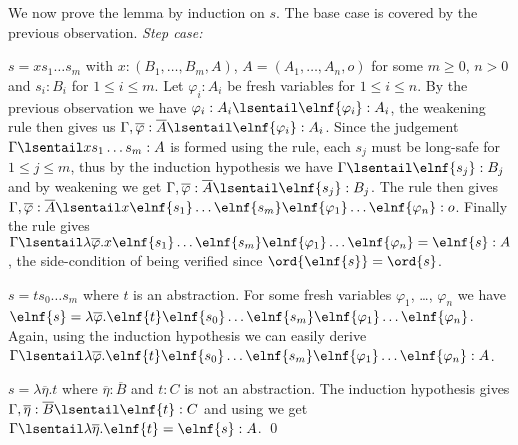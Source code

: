 We now prove the lemma by induction on $s$.
The base case is covered by the previous observation.
\emph{Step case:}
\begin{compactitem}
\item $s = x s_1 \ldots s_m$ with $x: (B_1, \ldots, B_m, A)$, $A = (A_1, \ldots, A_n, o)$ for some $m\geq 0$, $n>0$ and $s_i : B_i$ for $1 \leq i \leq
  m$.  Let $\varphi_i: A_i$ be fresh variables for $1\leq i \leq
  n$. By the previous observation we have $\varphi_i :A_i \lsentail \elnf{\varphi_i} :A_i$, the weakening rule then gives us $\Gamma , \overline{\varphi} : \overline{A}
  \lsentail \elnf{\varphi_i} : A_i$.  Since the judgement
  $\Gamma \lsentail x s_1 \ldots s_m : A$ is formed using the  rule, each $s_j$ must be long-safe for $1\leq j \leq m$, thus by the induction hypothesis we have $\Gamma \lsentail \elnf{s_j} : B_j$ and by weakening we get $\Gamma, \overline{\varphi} :\overline{A} \lsentail \elnf{s_j} : B_j$.  The 
  rule then gives $\Gamma, \overline{\varphi} :\overline{A} \lsentail x \elnf{s_1} \ldots \elnf{s_m} \elnf{\varphi_1} \ldots \elnf{\varphi_n} : o$. Finally
  the  rule gives $\Gamma \lsentail \lambda \overline{\varphi} . x
  \elnf{s_1} \ldots \elnf{s_m} \elnf{\varphi_1} \ldots
  \elnf{\varphi_n} = \elnf{s} : A$, the side-condition of  being verified since $\ord{\elnf{s}} = \ord{s}$.


\item $s = t s_0 \ldots s_m$ where $t$ is an abstraction.
For some fresh variables $\varphi_1$, \ldots, $\varphi_n$
we have $\elnf{s} = \lambda \overline{\varphi}. \elnf{t} \elnf{s_0} \ldots \elnf{s_m} \elnf{\varphi_1}
  \ldots \elnf{\varphi_n}$. Again, using the induction hypothesis we can easily derive $\Gamma \lsentail
 \lambda \overline{\varphi}. \elnf{t} \elnf{s_0} \ldots \elnf{s_m} \elnf{\varphi_1} \ldots \elnf{\varphi_n} : A$.

\item $s = \lambda \overline{\eta} . t $ where
$\overline{\eta} : \overline{B}$ and $t:C$ is not an abstraction. The induction hypothesis gives $\Gamma,
  \overline{\eta} : \overline{B} \lsentail \elnf{t} : C$ and using
 we get $\Gamma \lsentail \lambda \overline{\eta} . \elnf{t} = \elnf{s} : A$.  \qed
\end{compactitem}

